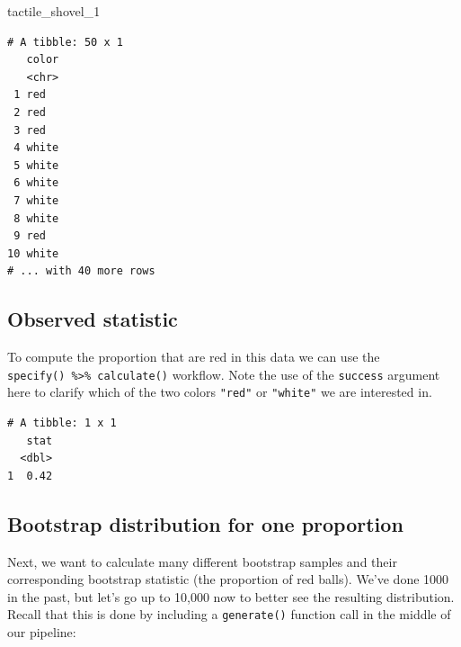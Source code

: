\documentclass[12pt, krantz2,]{krantz}
\makeatletter
\newenvironment{Shaded}{\begin{snugshade}}{\end{snugshade}}
\newcommand{\DataTypeTok}[1]{\textcolor[rgb]{0.27,0.27,0.27}{#1}}
\newcommand{\DecValTok}[1]{\textcolor[rgb]{0.06,0.06,0.06}{#1}}
\newcommand{\KeywordTok}[1]{\textcolor[rgb]{0.27,0.27,0.27}{\textbf{#1}}}
\newcommand{\NormalTok}[1]{#1}
\newcommand{\OperatorTok}[1]{\textcolor[rgb]{0.43,0.43,0.43}{\textbf{#1}}}
\newcommand{\OtherTok}[1]{\textcolor[rgb]{0.37,0.37,0.37}{#1}}
\newcommand{\StringTok}[1]{\textcolor[rgb]{0.5,0.5,0.5}{#1}}
\newenvironment{kframe}{%
\medskip{}
\setlength{\fboxsep}{.8em}
 \def\at@end@of@kframe{}%
 \ifinner\ifhmode%
  \def\at@end@of@kframe{\end{minipage}}%
  \begin{minipage}{\columnwidth}%
 \fi\fi%
 \def\FrameCommand##1{\hskip\@totalleftmargin \hskip-\fboxsep
 \colorbox{shadecolor}{##1}\hskip-\fboxsep
     \hskip-\linewidth \hskip-\@totalleftmargin \hskip\columnwidth}%
 \MakeFramed {\advance\hsize-\width
   \@totalleftmargin\z@ \linewidth\hsize
   \@setminipage}}%
 {\par\unskip\endMakeFramed%
 \at@end@of@kframe}
\renewenvironment{Shaded}{\begin{kframe}}{\end{kframe}}
\makeatother
\begin{document}
\begin{Shaded}
\begin{Highlighting}[]
\NormalTok{tactile_shovel_}\DecValTok{1}
\end{Highlighting}
\end{Shaded}

\begin{verbatim}
# A tibble: 50 x 1
   color
   <chr>
 1 red  
 2 red  
 3 red  
 4 white
 5 white
 6 white
 7 white
 8 white
 9 red  
10 white
# ... with 40 more rows
\end{verbatim}

\hypertarget{observed-statistic}{%
\subsection{Observed statistic}\label{observed-statistic}}

To compute the proportion that are red in this data we can use the \texttt{specify()\ \%\textgreater{}\%\ calculate()} workflow. Note the use of the \texttt{success} argument here to clarify which of the two colors \texttt{"red"} or \texttt{"white"} we are interested in.

\begin{Shaded}
\end{Shaded}

\begin{verbatim}
# A tibble: 1 x 1
   stat
  <dbl>
1  0.42
\end{verbatim}

\hypertarget{one-prop-boot}{%
\subsection{Bootstrap distribution for one proportion}\label{one-prop-boot}}

Next, we want to calculate many different bootstrap samples and their corresponding bootstrap statistic (the proportion of red balls). We've done 1000 in the past, but let's go up to 10,000 now to better see the resulting distribution. Recall that this is done by including a \texttt{generate()} function call in the middle of our pipeline:
\end{document}
